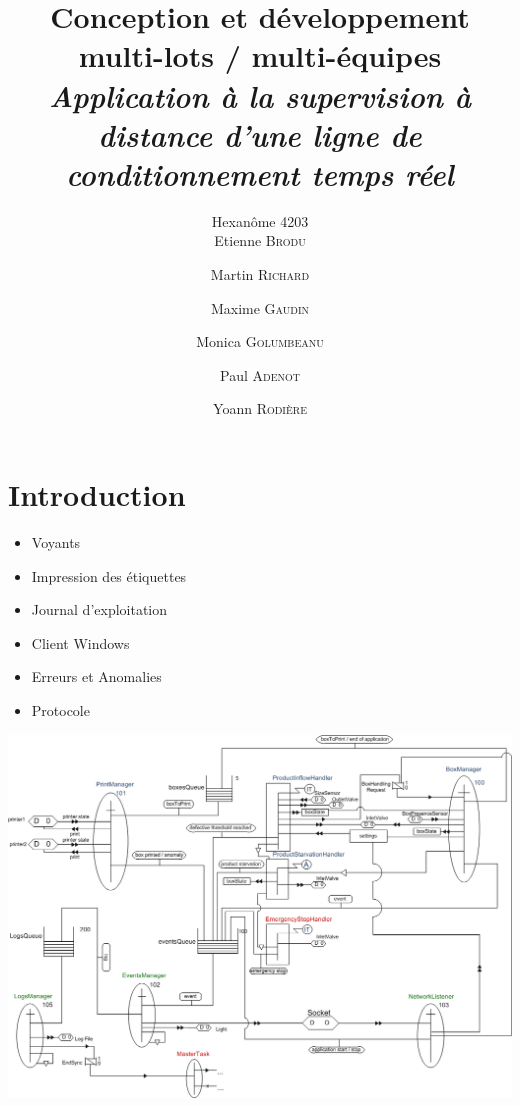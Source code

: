\documentclass{beamer}
\title{Conception et développement multi-lots / multi-équipes\\ \emph{Application à la supervision à distance d'une ligne de conditionnement temps réel}}
\author{Hexanôme 4203\\ Etienne \textsc{Brodu} \and Martin \textsc{Richard} \and Maxime \textsc{Gaudin} \\ \and Monica \textsc{Golumbeanu} \and Paul \textsc{Adenot} \and Yoann \textsc{Rodière}}
\begin{document}
	\begin{frame}
		\titlepage
	\end{frame}

\section{Introduction}
	\begin{frame}
		\begin{itemize}	
			\item Voyants
			\item Impression des étiquettes %
			\item Journal d'exploitation
			\item Client Windows
			\item Erreurs et Anomalies
			\item Protocole
		\end{itemize}
	\end{frame}

	\begin{frame}
		\includegraphics[width=\textwidth]{../../SchemasLCG/schemaGlobal.png}
	\end{frame}
\end{document}
